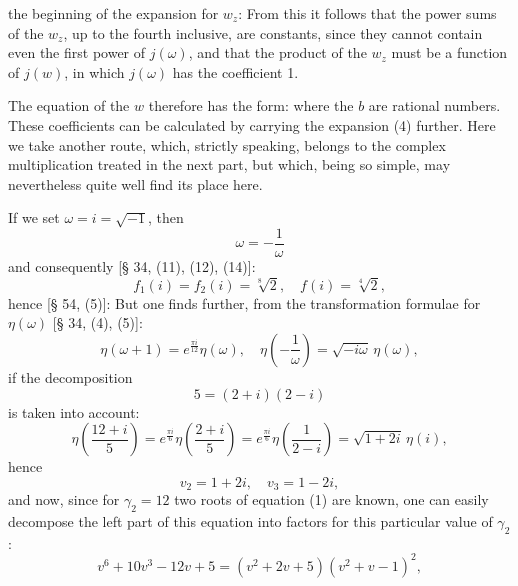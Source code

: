 the beginning of the expansion for $w_z$:
From this it follows that the power sums of the $w_z$, up to the fourth inclusive, are constants, since they cannot contain even the first power of $j(\omega)$, and that the product of the $w_z$ must be a  function of $j(w)$, %
in which $j(\omega)$ has the coefficient 1.

The equation of the $w$ therefore has the form:
where the $b$ are rational numbers. These coefficients can be calculated by carrying the expansion (4) further. Here we take another route, which, strictly speaking, belongs to the complex multiplication treated in the next part, but which, being so simple, may nevertheless quite well find its place here.

If we set $\omega = i = \sqrt{-1}$, then
\[ \omega = -\frac{1}{\omega} \]
and consequently [§ 34, (11), (12), (14)]:
\[ f_1(i) = f_2(i) = \sqrt[8]{2}, \quad f(i) = \sqrt[4]{2}, \]
hence [§ 54, (5)]:
But one finds further, from the transformation formulae for $\eta(\omega)$ [§ 34, (4), (5)]:
\[ \eta(\omega+1) = e^{\frac{\pi i}{12}} \eta(\omega), \quad \eta\left(-\frac{1}{\omega}\right) = \sqrt{-i\omega}\,\eta(\omega), \]
if the decomposition
\[ 5 = (2+i)(2-i) \]
is taken into account:
\[ \eta\left(\frac{12+i}{5}\right) = e^{\frac{\pi i}{6}} \eta\left(\frac{2+i}{5}\right) = e^{\frac{\pi i}{6}} \eta\left(\frac{1}{2-i}\right) = \sqrt{1+2i}\,\eta(i), \]
hence
\[ v_2 = 1+2i, \quad v_3 = 1-2i, \]
and now, since for $\gamma_2 = 12$ two roots of equation (1) are known, one can easily decompose the left part of this equation into factors for this particular value of $\gamma_2$:
\[ v^6 + 10v^3 - 12v + 5 = (v^2+2v+5)(v^2+v-1)^2, \]
